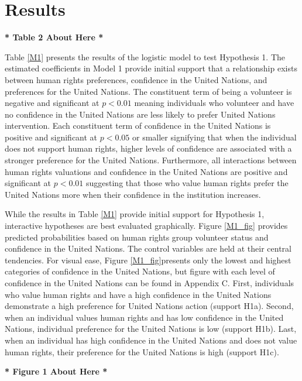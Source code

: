 \documentclass[12pt]{article}
\newcommand{\UN}[1]{United Nations}
\begin{document}
\section*{Results}

\begin{center}
{\large \textbf{* Table 2 About Here *}}
\end{center}

Table \ref{M1} presents the results of the logistic model to test Hypothesis 1. The estimated coefficients in Model 1 provide initial support that a relationship exists between human rights preferences, confidence in the United Nations, and preferences for the \UN{}. The constituent term of being a volunteer is negative and significant at $p < 0.01$ meaning individuals who volunteer and have no confidence in the \UN{} are less likely to prefer \UN{} intervention. Each constituent term of confidence in the \UN{} is positive and significant at $p < 0.05$ or smaller signifying that when the individual does not support human rights, higher levels of confidence are associated with a stronger preference for the \UN{}. Furthermore, all interactions between human rights valuations and confidence in the \UN{} are positive and significant at $p < 0.01$ suggesting that those who value human rights prefer the \UN{} more when their confidence in the institution increases. 

While the results in Table \ref{M1} provide initial support for Hypothesis 1, interactive hypotheses are best evaluated graphically. Figure \ref{M1_fig} provides predicted probabilities based on human rights group volunteer status and confidence in the \UN{}. The control variables are held at their central tendencies. For visual ease, Figure \ref{M1_fig}\footnotemark[11] presents only the lowest and highest categories of confidence in the \UN{}, but figure with each level of confidence in the \UN{} can be found in Appendix C. First, individuals who value human rights and have a high confidence in the \UN{} demonstrate a high preference for \UN{} action (support H1a). Second, when an individual values human rights and has low confidence in the \UN{}, individual preference for the \UN{} is low (support H1b). Last, when an individual has high confidence in the \UN{} and does not value human rights, their preference for the \UN{} is high (support H1c). 

\begin{center}
{\large \textbf{* Figure 1 About Here *}}
\end{center}
\end{document}
